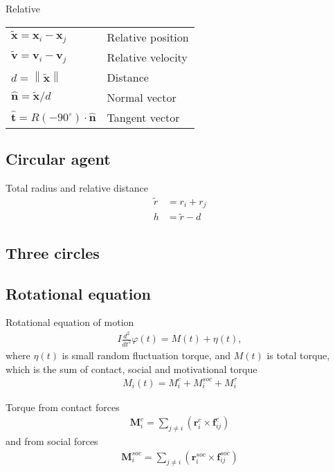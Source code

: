 Relative

\begin{tabularx}{1.0\linewidth}{ll}
\hline
\hline
$ \tilde{\mathbf{x}} = \mathbf{x}_{i} - \mathbf{x}_{j} $ & Relative position \\
$ \tilde{\mathbf{v}} = \mathbf{v}_{i} - \mathbf{v}_{j} $ & Relative velocity \\
$ d = \left\|\tilde{\mathbf{x}}\right\| $ & Distance\\
$ \hat{\mathbf{n}} = \tilde{\mathbf{x}} / d $ & Normal vector \\
$ \hat{\mathbf{t}} = R(-90^{\circ}) \cdot \hat{\mathbf{n}} $ & Tangent vector \\
\hline
\hline
\end{tabularx}



\subsection{Circular agent}
Total radius and relative distance
\begin{align}
\tilde{r} &= r_{i} + r_{j} \\
h &= \tilde{r} - d
\end{align}


\subsection{Three circles}



\subsection{Rotational equation}

Rotational equation of motion 
\begin{align}
I \frac{d^{2}}{d t^{2}} \varphi(t) = M(t) + \eta(t),
\end{align}
where $ \eta(t) $ is small random fluctuation torque, and $ M(t) $ is total torque, which is the sum of contact, social and motivational torque
\begin{align}
M_{i}(t) = M_{i}^{c} + M_{i}^{soc} + M_{i}^{\tau}
\end{align}

Torque from contact forces
\begin{align}
\mathbf{M}_{i}^{c} = \sum_{j\neq i}^{} \left(\mathbf{r}_{i}^{c} \times \mathbf{f}_{ij}^{c}\right)
\end{align}
and from social forces
\begin{align}
\mathbf{M}_{i}^{soc} = \sum_{j\neq i}^{} \left(\mathbf{r}_{i}^{soc} \times \mathbf{f}_{ij}^{soc}\right)
\end{align}

